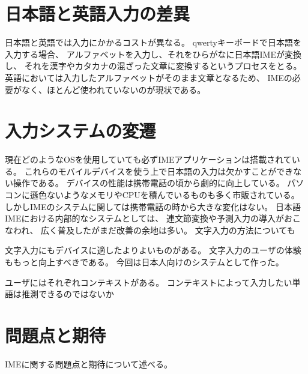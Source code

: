 \section{日本語と英語入力の差異}
日本語と英語では入力にかかるコストが異なる。
qwertyキーボードで日本語を入力する場合、
アルファベットを入力し、それをひらがなに日本語IMEが変換し、
それを漢字やカタカナの混ざった文章に変換するというプロセスをとる。
英語においては入力したアルファベットがそのまま文章となるため、
IMEの必要がなく、ほとんど使われていないのが現状である。

\section{入力システムの変遷}
現在どのようなOSを使用していても必ずIMEアプリケーションは搭載されている。
これらのモバイルデバイスを使う上で日本語の入力は欠かすことができない操作である。
デバイスの性能は携帯電話の頃から劇的に向上している。
パソコンに遜色ないようなメモリやCPUを積んでいるものも多く市販されている。
しかしIMEのシステムに関しては携帯電話の時から大きな変化はない。
日本語IMEにおける内部的なシステムとしては、
連文節変換や予測入力\cite{pobox}の導入がおこなわれ、
広く普及したがまだ改善の余地は多い。
文字入力の方法についても

文字入力にもデバイスに適したよりよいものがある。
文字入力のユーザの体験ももっと向上すべきである。
今回は日本人向けのシステムとして作った。

ユーザにはそれぞれコンテキストがある。
コンテキストによって入力したい単語は推測できるのではないか

\section{問題点と期待}
IMEに関する問題点と期待について述べる。


